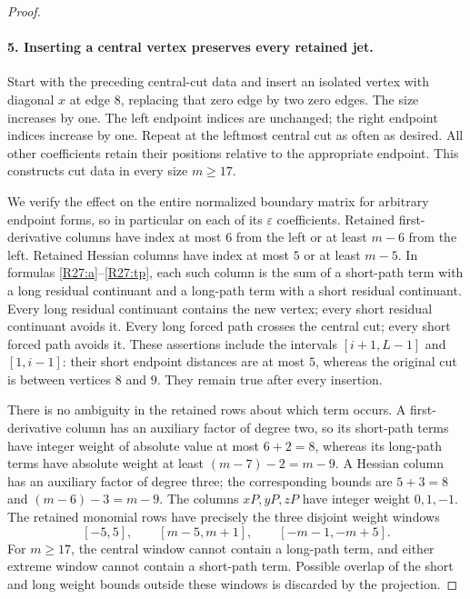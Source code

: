 \begin{proof}
\paragraph{5. Inserting a central vertex preserves every retained jet.}
Start with the preceding central-cut data and insert an isolated
vertex with diagonal $x$ at edge $8$, replacing that zero edge
by two zero edges. The size increases by one. The left endpoint
indices are unchanged; the right endpoint indices increase by
one. Repeat at the leftmost central cut as often as desired.
All other coefficients retain their positions relative to the
appropriate endpoint. This constructs cut data in every size
$m\geq17$.

We verify the effect on the entire normalized boundary matrix
for arbitrary endpoint forms, so in particular on each of its
$\varepsilon$ coefficients. Retained first-derivative columns
have index at most $6$ from the left or at least $m-6$ from the
left. Retained Hessian columns have index at most $5$ or at
least $m-5$. In formulas \eqref{R27:a}--\eqref{R27:tp}, each
such column is the sum of a short-path term with a long residual
continuant and a long-path term with a short residual continuant.
Every long residual continuant contains the new vertex; every
short residual continuant avoids it. Every long forced path
crosses the central cut; every short forced path avoids it.
These assertions include the intervals $[i+1,L-1]$ and
$[1,i-1]$: their short endpoint distances are at most $5$,
whereas the original cut is between vertices $8$ and $9$.
They remain true after every insertion.

There is no ambiguity in the retained rows about which term
occurs. A first-derivative column has an auxiliary factor of
degree two, so its short-path terms have integer weight of
absolute value at most $6+2=8$, whereas its long-path terms
have absolute weight at least $(m-7)-2=m-9$.
A Hessian column has an auxiliary factor of degree three;
the corresponding bounds are $5+3=8$ and $(m-6)-3=m-9$.
The columns $xP,yP,zP$ have integer weight $0,1,-1$.
The retained monomial rows have precisely the three disjoint
weight windows
\begin{equation}\label{R27:windows}
 [-5,5],\qquad [m-5,m+1],\qquad [-m-1,-m+5].
\end{equation}
For $m\geq17$, the central window cannot contain a long-path
term, and either extreme window cannot contain a short-path
term. Possible overlap of the short and long weight bounds
outside these windows is discarded by the projection.


\end{proof}
